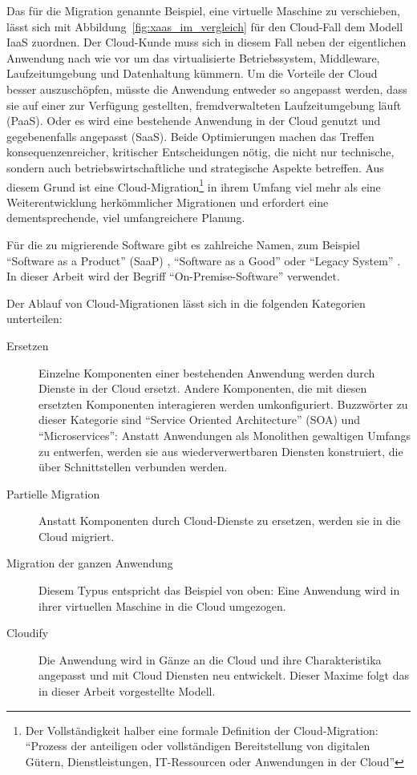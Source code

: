 Das für die Migration genannte Beispiel, eine virtuelle Maschine zu
verschieben, lässt sich mit Abbildung~\ref{fig:xaas_im_vergleich} für den
Cloud-Fall dem Modell IaaS zuordnen. Der Cloud-Kunde muss sich in diesem Fall
neben der eigentlichen Anwendung nach wie vor um das virtualisierte
Betriebssystem, Middleware, Laufzeitumgebung und Datenhaltung kümmern. Um die
Vorteile der Cloud besser auszuschöpfen, müsste die Anwendung entweder so
angepasst werden, dass sie auf einer zur Verfügung gestellten, fremdverwalteten
Laufzeitumgebung läuft (PaaS). Oder es wird eine bestehende Anwendung in der
Cloud genutzt und gegebenenfalls angepasst (SaaS). Beide Optimierungen
machen das Treffen konsequenzenreicher, kritischer Entscheidungen nötig, die 
nicht nur technische, sondern auch betriebswirtschaftliche und 
strategische Aspekte betreffen. 
Aus diesem Grund ist eine Cloud-Migration\footnote{Der Vollständigkeit halber
eine formale Definition der Cloud-Migration: "`Prozess der anteiligen
oder
vollständigen Bereitstellung von digitalen Gütern, Dienstleistungen,
IT-Ressourcen oder Anwendungen in der Cloud"'}
 in ihrem Umfang viel mehr als eine Weiterentwicklung 
herkömmlicher Migrationen und erfordert eine dementsprechende, viel 
umfangreichere
Planung. 

Für die zu migrierende Software gibt es zahlreiche Namen, zum Beispiel 
"`Software as a Product"' (SaaP) 
, "`Software as a Good"' 
 oder "`Legacy System"' 
. In dieser Arbeit wird 
der Begriff "`On-Premise-Software"' verwendet.

Der Ablauf von Cloud-Migrationen lässt sich in die folgenden Kategorien 
unterteilen:  
\begin{description}
	\item[Ersetzen] Einzelne Komponenten einer bestehenden Anwendung werden
durch Dienste in der Cloud ersetzt. Andere Komponenten, die mit diesen
ersetzten Komponenten interagieren werden umkonfiguriert. Buzzwörter zu dieser 
Kategorie sind "`Service Oriented Architecture"' (SOA) und "`Microservices"': 
Anstatt Anwendungen als Monolithen gewaltigen Umfangs zu entwerfen, werden sie 
aus wiederverwertbaren Diensten konstruiert, die über Schnittstellen 
verbunden werden.
	\item[Partielle Migration] Anstatt Komponenten durch Cloud-Dienste zu
ersetzen, werden sie in die Cloud migriert.
	\item[Migration der ganzen Anwendung] Diesem Typus entspricht das 
Beispiel von oben: Eine Anwendung wird in ihrer virtuellen Maschine in die 
Cloud umgezogen.
	\item[Cloudify] Die Anwendung wird in Gänze an die Cloud und ihre
Charakteristika angepasst und mit Cloud Diensten neu entwickelt. Dieser Maxime 
folgt das in dieser Arbeit vorgestellte Modell.
\end{description}

